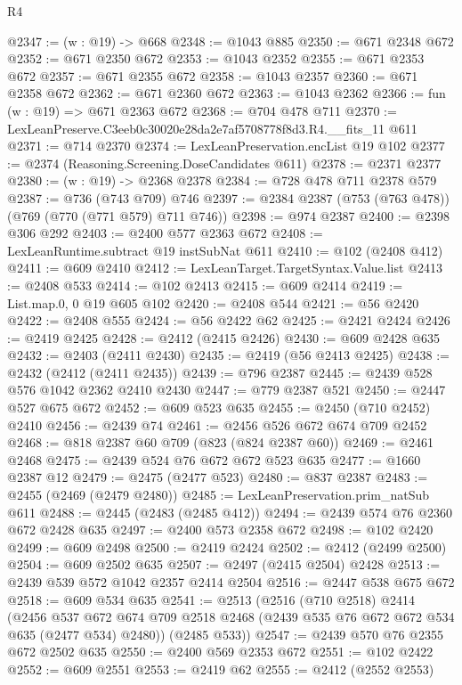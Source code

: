 \begin{lexlean}{R4}
\begin{coremodule}
@2347 := (w : @19) -> @668
@2348 := @1043 @885
@2350 := @671 @2348 @672
@2352 := @671 @2350 @672
@2353 := @1043 @2352
@2355 := @671 @2353 @672
@2357 := @671 @2355 @672
@2358 := @1043 @2357
@2360 := @671 @2358 @672
@2362 := @671 @2360 @672
@2363 := @1043 @2362
@2366 := fun (w : @19) => @671 @2363 @672
@2368 := @704 @478 @711
@2370 := LexLeanPreserve.C3eeb0c30020e28da2e7af5708778f8d3.R4.__fits_11 @611
@2371 := @714 @2370
@2374 := LexLeanPreservation.encList @19 @102
@2377 := @2374 (Reasoning.Screening.DoseCandidates @611)
@2378 := @2371 @2377
@2380 := (w : @19) -> @2368 @2378
@2384 := @728 @478 @711 @2378 @579
@2387 := @736 (@743 @709) @746
@2397 := @2384 @2387 (@753 (@763 @478)) (@769 (@770 (@771 @579) @711 @746))
@2398 := @974 @2387
@2400 := @2398 @306 @292
@2403 := @2400 @577 @2363 @672
@2408 := LexLeanRuntime.subtract @19 instSubNat @611
@2410 := @102 (@2408 @412)
@2411 := @609 @2410
@2412 := LexLeanTarget.TargetSyntax.Value.list
@2413 := @2408 @533
@2414 := @102 @2413
@2415 := @609 @2414
@2419 := List.map.{0, 0} @19 @605 @102
@2420 := @2408 @544
@2421 := @56 @2420
@2422 := @2408 @555
@2424 := @56 @2422 @62
@2425 := @2421 @2424
@2426 := @2419 @2425
@2428 := @2412 (@2415 @2426)
@2430 := @609 @2428 @635
@2432 := @2403 (@2411 @2430)
@2435 := @2419 (@56 @2413 @2425)
@2438 := @2432 (@2412 (@2411 @2435))
@2439 := @796 @2387
@2445 := @2439 @528 @576 @1042 @2362 @2410 @2430
@2447 := @779 @2387 @521
@2450 := @2447 @527 @675 @672
@2452 := @609 @523 @635
@2455 := @2450 (@710 @2452) @2410
@2456 := @2439 @74
@2461 := @2456 @526 @672 @674 @709 @2452
@2468 := @818 @2387 @60 @709 (@823 (@824 @2387 @60))
@2469 := @2461 @2468
@2475 := @2439 @524 @76 @672 @672 @523 @635
@2477 := @1660 @2387 @12
@2479 := @2475 (@2477 @523)
@2480 := @837 @2387
@2483 := @2455 (@2469 (@2479 @2480))
@2485 := LexLeanPreservation.prim_natSub @611
@2488 := @2445 (@2483 (@2485 @412))
@2494 := @2439 @574 @76 @2360 @672 @2428 @635
@2497 := @2400 @573 @2358 @672
@2498 := @102 @2420
@2499 := @609 @2498
@2500 := @2419 @2424
@2502 := @2412 (@2499 @2500)
@2504 := @609 @2502 @635
@2507 := @2497 (@2415 @2504) @2428
@2513 := @2439 @539 @572 @1042 @2357 @2414 @2504
@2516 := @2447 @538 @675 @672
@2518 := @609 @534 @635
@2541 := @2513
    (@2516
      (@710 @2518)
      @2414
      (@2456
        @537
        @672
        @674
        @709
        @2518
        @2468
        (@2439 @535 @76 @672 @672 @534 @635 (@2477 @534) @2480))
      (@2485 @533))
@2547 := @2439 @570 @76 @2355 @672 @2502 @635
@2550 := @2400 @569 @2353 @672
@2551 := @102 @2422
@2552 := @609 @2551
@2553 := @2419 @62
@2555 := @2412 (@2552 @2553)

\end{coremodule}
\end{lexlean}
